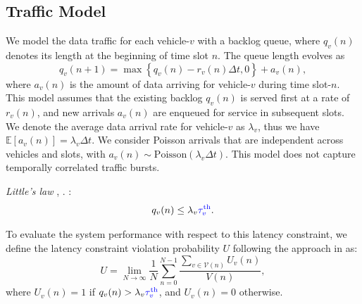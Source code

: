 \documentclass[conference, a4paper]{IEEEtran}
\newcommand{\rev}[1]{\textcolor{revisioncolor}{{}#1}}
\newif\ifshowdeletions
\newcommand{\currentdel}[1]{\ifshowdeletions\textcolor{deletioncolor}{\sout{#1}}\fi}
\theoremstyle{remark}
\begin{document}
\subsection{Traffic Model}
We model the data traffic for each vehicle-$v$ with a backlog queue, where $q_v(n)$ denotes its length at the beginning of time slot $n$. The queue length evolves as
\begin{equation}
    q_v(n+1) = \max \left\{ q_v(n) - r_v(n) \Delta t, 0 \right\} + a_v(n),
    \label{eq: queue update}
\end{equation}
where $a_v(n)$ is the amount of data arriving for vehicle-$v$ during time slot-$n$.
This model assumes that the existing backlog $q_v(n)$ is served first at a rate of $r_v(n)$, and new arrivals $a_v(n)$ are enqueued for service in subsequent slots. 
We denote the average data arrival rate for vehicle-$v$ as $\lambda_v$, thus we have $\mathbb{E}\left[ a_v(n) \right] = \lambda_v \Delta t$.
\rev{We consider Poisson arrivals that are independent across vehicles and slots, with $a_v(n)\sim\mathrm{Poisson} (\lambda_v\Delta t)$. This model does not capture temporally correlated traffic bursts.}

\currentdel{According to} \textit{Little's law} \cite{little1961proof}, \currentdel{the queuing latency $\tau_v(n)\approx \lambda_v^{-1}q_v(n)$}. \currentdel{To keep $\tau_v(n)$ no more than a latency threshold $\tau_{\rm th}$, the queue length should satisfy the following latency constraint}:
\begin{equation}
    q_v(n) \leq \lambda_v \text{\currentdel{$\tau^{{\rm th}}$}}\rev{\tau_v^{\rm th}}.
    \label{eq:queue length cons}
\end{equation}

To evaluate the system performance with respect to this latency constraint, we define the latency constraint violation probability $U$ following the approach in \cite{kien17} as:
\begin{equation}
    U = \lim_{N\rightarrow\infty}\frac{1}{N}\sum_{n=0}^{N-1}  \frac{\sum_{v\in\mathcal{V}(n)}U_v(n)}{V(n)},
    \label{eq:violation probability}
\end{equation}
where $U_v(n) = 1$ if $q_v(n) > \lambda_v \text{\currentdel{$\tau^{{\rm th}}$}}\rev{\tau_v^{\rm th}}$, and $U_v(n) = 0$ otherwise. \currentdel{This metric serves as a measure of the system latency reliability.}
\end{document}
